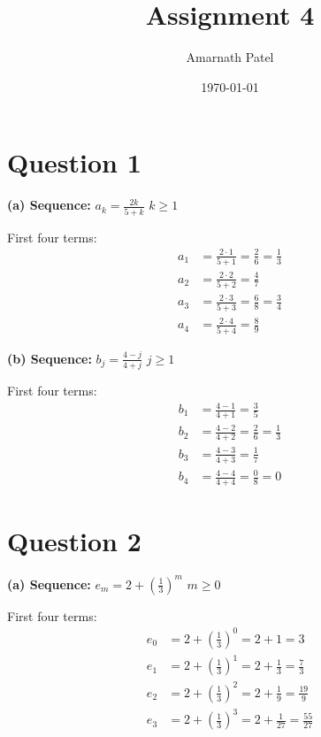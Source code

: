 \documentclass{article}
\begin{document}
\author{Amarnath Patel}
\date{\today}
\title{Assignment 4}
\maketitle

\section*{Question 1}

\textbf{(a) Sequence: } $a_k = \frac{2k}{5 + k}$  $k \geq 1$

First four terms:
\begin{align*}
a_1 &= \frac{2 \cdot 1}{5 + 1} = \frac{2}{6} = \frac{1}{3} \\
a_2 &= \frac{2 \cdot 2}{5 + 2} = \frac{4}{7} \\
a_3 &= \frac{2 \cdot 3}{5 + 3} = \frac{6}{8} = \frac{3}{4} \\
a_4 &= \frac{2 \cdot 4}{5 + 4} = \frac{8}{9}
\end{align*}

\textbf{(b) Sequence: } $b_j = \frac{4 - j}{4 + j}$  $j \geq 1$

First four terms:
\begin{align*}
b_1 &= \frac{4 - 1}{4 + 1} = \frac{3}{5} \\
b_2 &= \frac{4 - 2}{4 + 2} = \frac{2}{6} = \frac{1}{3} \\
b_3 &= \frac{4 - 3}{4 + 3} = \frac{1}{7} \\
b_4 &= \frac{4 - 4}{4 + 4} = \frac{0}{8} = 0
\end{align*}

\section*{Question 2}

\textbf{(a) Sequence: } $e_m = 2 + \left(\frac{1}{3}\right)^m$  $m \geq 0$

First four terms:
\begin{align*}
e_0 &= 2 + \left(\frac{1}{3}\right)^0 = 2 + 1 = 3 \\
e_1 &= 2 + \left(\frac{1}{3}\right)^1 = 2 + \frac{1}{3} = \frac{7}{3} \\
e_2 &= 2 + \left(\frac{1}{3}\right)^2 = 2 + \frac{1}{9} = \frac{19}{9} \\
e_3 &= 2 + \left(\frac{1}{3}\right)^3 = 2 + \frac{1}{27} = \frac{55}{27}
\end{align*}
\end{document}
